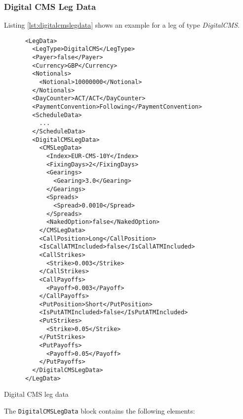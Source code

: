 \subsubsection{Digital CMS Leg Data}
\label{ss:digitalcmslegdata}

Listing \ref{lst:digitalcmslegdata} shows an example for a leg of type \emph{DigitalCMS}.

\begin{listing}[H]
\begin{verbatim}
      <LegData>
        <LegType>DigitalCMS</LegType>
        <Payer>false</Payer>
        <Currency>GBP</Currency>
        <Notionals>
          <Notional>10000000</Notional>
        </Notionals>
        <DayCounter>ACT/ACT</DayCounter>
        <PaymentConvention>Following</PaymentConvention>
        <ScheduleData>
          ...
        </ScheduleData>
        <DigitalCMSLegData>
          <CMSLegData>
            <Index>EUR-CMS-10Y</Index>
            <FixingDays>2</FixingDays>
            <Gearings>
              <Gearing>3.0</Gearing>
            </Gearings>
            <Spreads>
              <Spread>0.0010</Spread>
            </Spreads>
            <NakedOption>false</NakedOption>
          </CMSLegData>
          <CallPosition>Long</CallPosition>
          <IsCallATMIncluded>false</IsCallATMIncluded>
          <CallStrikes>
            <Strike>0.003</Strike>
          </CallStrikes>
          <CallPayoffs>
            <Payoff>0.003</Payoff>
          </CallPayoffs>
          <PutPosition>Short</PutPosition>
          <IsPutATMIncluded>false</IsPutATMIncluded>
          <PutStrikes>
            <Strike>0.05</Strike>
          </PutStrikes>
          <PutPayoffs>
            <Payoff>0.05</Payoff>
          </PutPayoffs>
        </DigitalCMSLegData>
      </LegData>
\end{verbatim}
\caption{Digital CMS leg data}
\label{lst:digitalcmslegdata}
\end{listing}

The \lstinline!DigitalCMSLegData! block contains the following elements:

